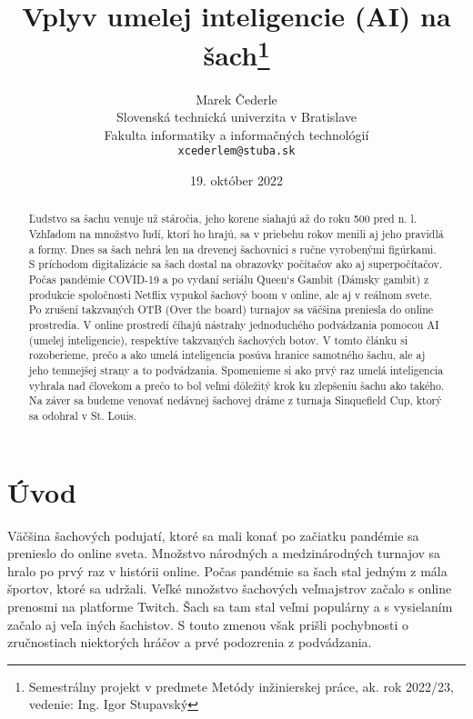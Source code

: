 \documentclass[10pt,oneside,slovak,a4paper]{article}
\title{Vplyv umelej inteligencie (AI) na šach\thanks{Semestrálny projekt v predmete Metódy inžinierskej práce, ak. rok 2022/23, vedenie: Ing. Igor Stupavský }} %
\author{Marek Čederle\\[2pt]
	{\small Slovenská technická univerzita v Bratislave}\\
	{\small Fakulta informatiky a informačných technológií}\\
	{\small \texttt{xcederlem@stuba.sk}}
	}
\date{\small 19. október 2022}
\begin{document}
\maketitle

\begin{abstract}
Ľudstvo sa šachu venuje už stáročia, jeho korene siahajú až do roku 500 pred n. l. Vzhľadom na množstvo ľudí, ktorí ho hrajú, sa v priebehu rokov menili aj jeho pravidlá a formy. Dnes sa šach nehrá len na drevenej šachovnici s ručne vyrobenými figúrkami. S príchodom digitalizácie sa šach dostal na  obrazovky počítačov ako aj superpočítačov. Počas pandémie COVID-19 a po vydaní seriálu Queen‘s Gambit (Dámsky gambit) z produkcie spoločnosti Netflix vypukol šachový boom v online, ale aj v reálnom svete. Po zrušení takzvaných OTB (Over the board) turnajov sa väčšina preniesla do online prostredia. V online prostredí číhajú nástrahy jednoduchého podvádzania pomocou AI (umelej inteligencie), respektíve takzvaných šachových botov. V tomto článku si rozoberieme, prečo a ako umelá inteligencia posúva hranice samotného šachu, ale aj jeho temnejšej strany a to podvádzania. Spomenieme si ako prvý raz umelá inteligencia vyhrala nad človekom a prečo to bol veľmi dôležitý krok ku zlepšeniu šachu ako takého. Na záver sa budeme venovať nedávnej šachovej dráme z turnaja Sinquefield Cup, ktorý sa odohral v St. Louis.
\end{abstract}





\section{Úvod}

Väčšina šachových podujatí, ktoré sa mali konať po začiatku pandémie sa prenieslo do online sveta. Množstvo národných a medzinárodných turnajov sa hralo po prvý raz v histórii online. Počas pandémie sa šach stal jedným z mála športov, ktoré sa udržali. Veľké množstvo šachových veľmajstrov začalo s online prenosmi na platforme Twitch. Šach sa tam stal veľmi populárny a s vysielaním začalo aj veľa iných šachistov. S touto zmenou však  prišli pochybnosti o zručnostiach niektorých hráčov a prvé podozrenia z podvádzania.\cite{IM20}

\end{document}
